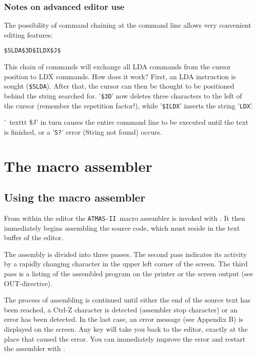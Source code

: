 \documentclass[10pt,a4paper,twoside,final,openright,titlepage]{memoir}
\def\atmas{\texttt{AT\-MAS-II }}
\newcommand{\key}[1]{\keystroke{\tiny #1}}
\begin{document}
\subsection{Notes on advanced editor use}

The possibility of command chaining at the command line allows very convenient editing features:

\par
\bigskip
	\texttt{\$SLDA\$3D\$ILDX\$J\$}\key{ESC}
\par
\bigskip

This chain of commands will exchange all LDA commands from the cursor position to LDX commands. How does it work?
First, an LDA instruction is sought (\texttt{\$SLDA}). After that, the cursor can then be thought to be positioned behind the string searched for.
'\texttt{\$3D}' now deletes three characters to the left of the cursor (remember the
repetition factor!), while '\texttt{\$ILDX}' inserts the string '\texttt{LDX}'.

'\ texttt {\$J}' in turn causes the entire command line to be executed until the text is finished, or a '\texttt{S?}'
error (String not found) occurs.

\chapter{The macro assembler}

\section{Using the macro assembler}

From within the editor the \atmas macro assembler is invoked with \key{CTRL-Y}.
It then immediately begins assembling the source code, which must reside in the text buffer of the editor.

The assembly is divided into three passes. The second pass indicates its activity by a rapidly changing
character in the upper left corner of the screen.
The third pass is a listing of the assembled program on the printer or the screen output (see OUT-directive).


The process of assembling is continued until either the end of the source text has been reached,
a Ctrl-Z character is detected (assembler stop character) or an error has been detected.
In the last case, an error message (see Appendix B) is displayed on the screen.
Any key will take you back to the editor, exactly at the place that caused the error.
You can immediately improve the error and restart the assembler with \key{CTRL-Y}.
\end{document}
